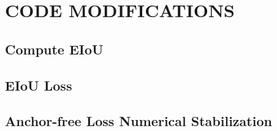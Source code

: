 \chapter{CODE MODIFICATIONS}

\section{Compute EIoU}

\section{EIoU Loss}

\section{Anchor-free Loss Numerical Stabilization}
